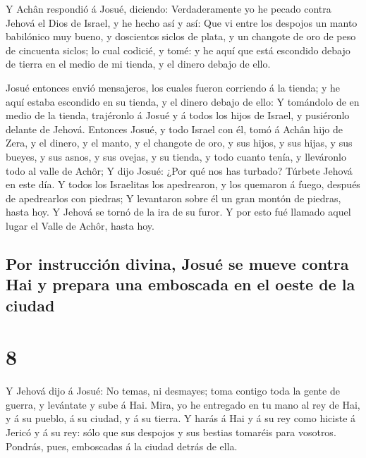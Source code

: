  Y Achân respondió á Josué, diciendo: Verdaderamente yo
he pecado contra Jehová el Dios de Israel, y he hecho así y así:
 Que vi entre los despojos un manto babilónico muy bueno,
y doscientos siclos de plata, y un changote de oro de peso de cincuenta
siclos; lo cual codicié, y tomé: y he aquí que está escondido debajo de
tierra en el medio de mi tienda, y el dinero debajo de ello.

 Josué entonces envió mensajeros, los cuales fueron
corriendo á la tienda; y he aquí estaba escondido en su tienda, y el
dinero debajo de ello:  Y tomándolo de en medio de la
tienda, trajéronlo á Josué y á todos los hijos de Israel, y pusiéronlo
delante de Jehová.  Entonces Josué, y todo Israel con él,
tomó á Achân hijo de Zera, y el dinero, y el manto, y el changote de
oro, y sus hijos, y sus hijas, y sus bueyes, y sus asnos, y sus ovejas,
y su tienda, y todo cuanto tenía, y lleváronlo todo al valle de Achôr;
 Y dijo Josué: ¿Por qué nos has turbado? Túrbete Jehová
en este día. Y todos los Israelitas los apedrearon, y los quemaron á
fuego, después de apedrearlos con piedras;  Y levantaron
sobre él un gran montón de piedras, hasta hoy. Y Jehová se tornó de la
ira de su furor. Y por esto fué llamado aquel lugar el Valle de Achôr,
hasta hoy.

\hypertarget{por-instrucciuxf3n-divina-josuuxe9-se-mueve-contra-hai-y-prepara-una-emboscada-en-el-oeste-de-la-ciudad}{%
\subsection{Por instrucción divina, Josué se mueve contra Hai y prepara
una emboscada en el oeste de la
ciudad}\label{por-instrucciuxf3n-divina-josuuxe9-se-mueve-contra-hai-y-prepara-una-emboscada-en-el-oeste-de-la-ciudad}}

\hypertarget{section-7}{%
\section{8}\label{section-7}}

 Y Jehová dijo á Josué: No temas, ni desmayes; toma
contigo toda la gente de guerra, y levántate y sube á Hai. Mira, yo he
entregado en tu mano al rey de Hai, y á su pueblo, á su ciudad, y á su
tierra.  Y harás á Hai y á su rey como hiciste á Jericó y
á su rey: sólo que sus despojos y sus bestias tomaréis para vosotros.
Pondrás, pues, emboscadas á la ciudad detrás de ella.

